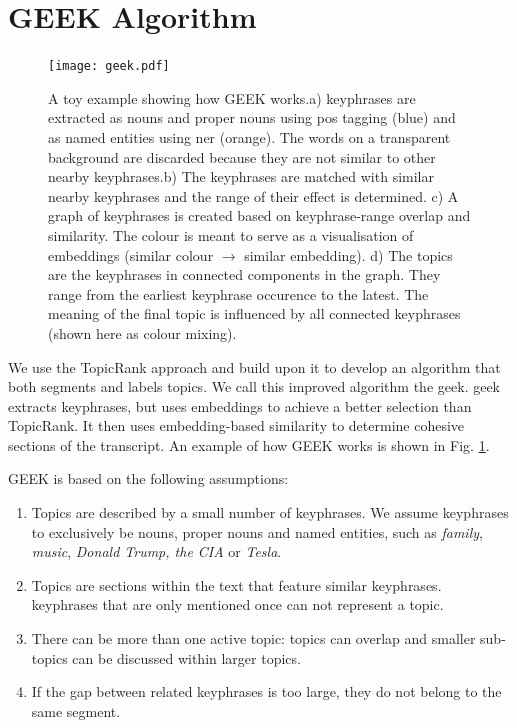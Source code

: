 \section{GEEK Algorithm}

    \begin{figure}
        \centering
        \texttt{[image: geek.pdf]}
        \caption{A toy example showing how GEEK works.\newline a) \Glspl{keyphrase} are extracted as nouns and proper nouns using \gls{pos} tagging (blue) and as named entities using \gls{ner} (orange). The words on a transparent background are discarded because they are not similar to other nearby \glspl{keyphrase}.\newline b) The \glspl{keyphrase} are matched with similar nearby \glspl{keyphrase} and the range of their effect is determined. \newline c) A graph of \glspl{keyphrase} is created based on \gls{keyphrase}-range overlap and similarity. The colour is meant to serve as a visualisation of embeddings (similar colour $\rightarrow$ similar embedding).\newline
        d) The topics are the \glspl{keyphrase} in connected components in the graph. They range from the earliest \gls{keyphrase} occurence to the latest. The meaning of the final topic is influenced by all connected \glspl{keyphrase} (shown here as colour mixing).
        }
        \label{fig:geek architecture}
    \end{figure}

We use the TopicRank approach and build upon it to develop an algorithm that both segments and labels topics. We call this improved algorithm the \gls{geek}. \gls{geek} extracts \glspl{keyphrase}, but uses \glspl{embedding} to achieve a better selection than TopicRank. It then uses embedding-based similarity to determine cohesive sections of the transcript. An example of how GEEK works is shown in Fig. \ref{fig:geek architecture}.

GEEK is based on the following assumptions:

\begin{enumerate}
    \item Topics are described by a small number of \glspl{keyphrase}. We assume \glspl{keyphrase} to exclusively be nouns, proper nouns and named entities, such as \textit{family}, \textit{music}, \textit{Donald Trump, the CIA} or \textit{Tesla}.
    \item Topics are sections within the text that feature similar \glspl{keyphrase}. \glspl{keyphrase} that are only mentioned once can not represent a topic.
    \item There can be more than one active topic: topics can overlap and smaller sub-topics can be discussed within larger topics.
    \item If the gap between related \glspl{keyphrase} is too large, they do not belong to the same segment.
\end{enumerate}

